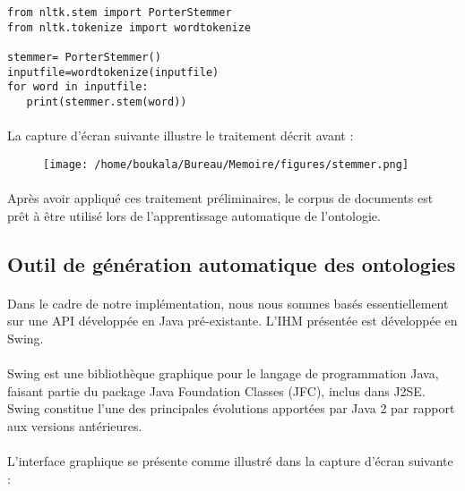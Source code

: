 \documentclass[12pt, a4paper, oneside]{book}
\begin{document}
\begin{verbatim}
from nltk.stem import PorterStemmer
from nltk.tokenize import wordtokenize

stemmer= PorterStemmer()
inputfile=wordtokenize(inputfile)
for word in inputfile:
   print(stemmer.stem(word))
\end{verbatim}
\paragraph{}
La capture d'écran suivante illustre le traitement décrit avant :


\begin{figure}[h!]
\begin{center}
\texttt{[image: /home/boukala/Bureau/Memoire/figures/stemmer.png]}
\end{center}
\end{figure}

\paragraph{}
Après avoir appliqué ces traitement préliminaires, le corpus de documents est prêt à être utilisé lors de l'apprentissage automatique de l'ontologie. 

\subsection{Outil de génération automatique des ontologies}
\paragraph{}
Dans le cadre de notre implémentation, nous nous sommes basés essentiellement sur une API développée en Java pré-existante. L'IHM présentée est développée en Swing.
\paragraph{}
Swing est une bibliothèque graphique pour le langage de programmation Java, faisant partie du package Java Foundation Classes (JFC), inclus dans J2SE. Swing constitue l'une des principales évolutions apportées par Java 2 par rapport aux versions antérieures.
\paragraph{}
L'interface graphique se présente comme illustré dans la capture d'écran suivante :
\end{document}
